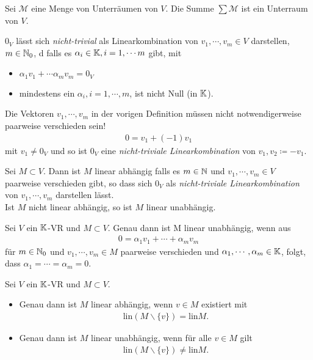 \begin{theorem}
Sei $\mathcal{M}$ eine Menge von Unterräumen von $V$. Die Summe $\sum\mathcal{M}$ ist ein Unterraum von $V$.
\end{theorem}

\begin{definition}
$0_V$ lässt sich \textit{nicht-trivial} als Linearkombination von $v_1,\dotsb,v_m\in V$ darstellen, $m\in \mathbb{N}_0$, d
falls es $\alpha_i\in\mathbb{K}, i=1,\dotsb m$ gibt, mit 
\begin{itemize}
    \item $\alpha_1v_1+\dotsb\alpha_m v_m = 0_V$
    \item mindestens ein $\alpha_i, i=1,\dotsb,m$, ist nicht Null (in $\mathbb{K}$).
\end{itemize}
\end{definition}

\begin{remark}
Die Vektoren $v_1,\dotsb,v_m$ in der vorigen Definition müssen nicht notwendigerweise paarweise verschieden sein!
\begin{align*}
    0=v_1+(-1)v_1
\end{align*}
mit $v_1\neq0_V$ und so ist $0_V$ eine \textit{nicht-triviale Linearkombination} von $v_1,v_2\coloneqq-v_1$.
\end{remark}

\begin{definition}
Sei $M\subset V$. Dann ist $M$ linear abhängig falls es $m\in \mathbb{N}$ und $v_1,\dotsb,v_m\in V$ paarweise verschieden gibt, so dass sich $0_V$ als \textit{nicht-triviale Linearkombination}
von $v_1,\dotsb,v_m$ darstellen lässt.\\
Ist $M$ nicht linear abhängig, so ist $M$ linear unabhängig.
\end{definition}

\begin{theorem}
Sei $V$ ein $\mathbb{K}$-VR und $M\subset V$. Genau dann ist M linear unabhängig, wenn aus
\begin{align*}
    0=\alpha_1 v_1 +\dotsb+\alpha_m v_m
\end{align*}
für $m\in\mathbb{N}_0$ und $v_1,\dotsb,v_m\in M$ paarweise verschieden und $\alpha_1,\dotsb,\alpha_m\in\mathbb{K}$, folgt, dass $\alpha_1=\dotsb=\alpha_m=0$.
\end{theorem}

\begin{theorem}
Sei $V$ ein $\mathbb{K}$-VR und $M\subset V$.
\begin{itemize}
    \item Genau dann ist $M$ linear abhängig, wenn $v\in M$ existiert mit 
    \begin{align*}
        \text{lin}(M\backslash\{v\})=\text{lin}M.
    \end{align*}
    \item Genau dann ist $M$ linear unabhängig, wenn für alle $v\in M$ gilt
    \begin{align*}
        \text{lin}(M\backslash\{v\})\neq\text{lin}M.
    \end{align*}
\end{itemize}
\end{theorem}

